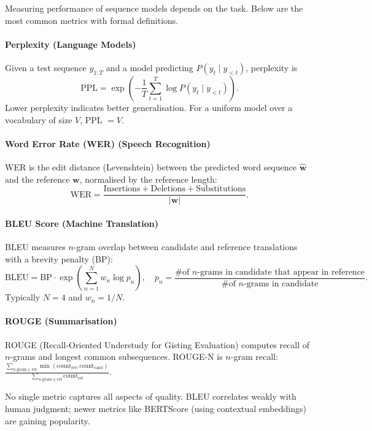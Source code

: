 \documentclass{tufte-handout}
\begin{document}
Measuring performance of sequence models depends on the task. Below are the most common metrics with formal definitions.

\paragraph{Perplexity (Language Models)}
Given a test sequence $y_{1:T}$ and a model predicting $P(y_t \mid y_{<t})$, perplexity is
\[
\text{PPL} = \exp\left(-\frac{1}{T}\sum_{t=1}^T \log P(y_t \mid y_{<t})\right).
\]
Lower perplexity indicates better generalisation. For a uniform model over a vocabulary of size $V$, PPL $= V$.

\paragraph{Word Error Rate (WER) (Speech Recognition)}
WER is the edit distance (Levenshtein) between the predicted word sequence $\hat{\mathbf{w}}$ and the reference $\mathbf{w}$, normalised by the reference length:
\[
\text{WER} = \frac{\text{Insertions} + \text{Deletions} + \text{Substitutions}}{|\mathbf{w}|}.
\]

\paragraph{BLEU Score (Machine Translation)}
BLEU measures $n$-gram overlap between candidate and reference translations with a brevity penalty (BP):
\[
\text{BLEU} = \text{BP} \cdot \exp\left(\sum_{n=1}^N w_n \log p_n\right),\quad
p_n = \frac{\text{\# of $n$-grams in candidate that appear in reference}}{\text{\# of $n$-grams in candidate}}.
\]
Typically $N=4$ and $w_n = 1/N$.

\paragraph{ROUGE (Summarisation)}
ROUGE (Recall-Oriented Understudy for Gisting Evaluation) computes recall of $n$-grams and longest common subsequences. ROUGE-N is $n$-gram recall: $\frac{\sum_{n\text{-gram} \in \text{ref}} \min(\text{count}_{\text{ref}}, \text{count}_{\text{cand}})}{\sum_{n\text{-gram} \in \text{ref}} \text{count}_{\text{ref}}}$.

\begin{remark}
    No single metric captures all aspects of quality. BLEU correlates weakly with human judgment; newer metrics like BERTScore (using contextual embeddings) are gaining popularity.
\end{remark}
\end{document}
